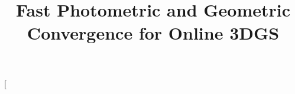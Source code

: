 \documentclass[nth=33]{humantech}
\begin{document}
\title{Fast Photometric and Geometric Convergence for Online 3DGS}
\twocolumn[
\begin{@twocolumnfalse}
\begin{flushleft}
\maketitle
\begin{abstract}
\justifying



\end{abstract}
\end{flushleft}
\end{@twocolumnfalse}
\end{document}
